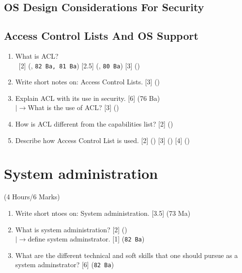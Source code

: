 \documentclass[12pt]{article}
\newcommand{\lb}{\\$\left|\rightarrow\right.$}
\newcommand{\enter}{\\\textcolor{white}{1}}
\begin{document}
	\subsection{OS Design Considerations For Security}
	\subsection{Access Control Lists And OS Support}
		\begin{enumerate}[noitemsep, topsep=0pt]
			\item What is ACL?
			\enter\hfill [2] (, \texttt{82 Ba, 81 Ba}) [2.5] (, \texttt{80 Ba}) [3] ()

			\item Write short notes on: Access Control Lists. \hfill [3] ()

			\item Explain ACL with its use in security. \hfill [6] (76 Ba)
			\lb What is the use of ACL? \hfill [3] ()

			\item How is ACL different from the capabilities list? \hfill [2] ()

			\item Describe how Access Control List is used. \hfill [2] () [3] () [4] ()
		\end{enumerate}

	\pagebreak

\section{System administration}
	\begin{center}(4 Hours/6 Marks)\end{center}
	
	\begin{enumerate}[noitemsep, topsep=0pt]
		\item Write short ntoes on: System administration. \hfill [3.5] (73 Ma)

		\item What is system administration? \hfill [2] ()
		\lb define system adminstrator. \hfill [1] (\texttt{82 Ba})
		
		\item What are the different technical and soft skills that one should pursue as a system adminstrator? \hfill [6] (\texttt{82 Ba})
	\end{enumerate}
\end{document}
